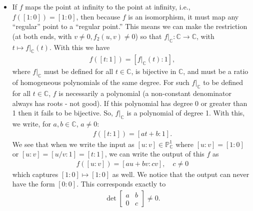 \documentclass[12pt]{article}
\newcommand{\C}{\mathbb{C}}
\begin{document}
\begin{itemize}
\item If $f$ maps the point at infinity to the point at infinity, i.e., $f([1:0]) = [1:0]$, then because $f$ is an isomorphism, it must map any ``regular'' point to a ``regular point.'' This means we can make the restriction (at both ends, with $v\neq 0, f_2(u,v)\neq 0$) so that $f\vert_\C : \C \to \C$, with $t\mapsto f\vert_\C(t)$. With this we have
\begin{align*}
f([t:1]) = [f\vert_\C(t) : 1],
\end{align*}
where $f\vert_\C$ must be defined for all $t\in \C$, is bijective in $\C$, and must be a ratio of homogeneous polynomials of the same degree. For such $f\vert_\C$ to be defined for all $t\in \C$, $f$ is necessarily a polynomial (a non-constant denominator always has roots - not good). If this polynomial has degree 0 or greater than 1 then it fails to be bijective. So, $f\vert_\C$ is a polynomial of degree 1. With this, we write, for $a, b \in \C$, $a \neq 0$:
\begin{align*}
f([t:1]) = [a t + b : 1].
\end{align*}
We see that when we write the input as $[u:v] \in \mathbb{P}^1_\C$ where $[u:v] = [1:0]$ or $[u:v] = [u/v:1] = [t:1]$, we can write the output of this $f$ as
\begin{align*}
f([u:v]) = [au+ bv : cv], \quad c\neq 0
\end{align*}
which captures $[1:0]\mapsto [1:0]$ as well. We notice that the output can never have the form $[0:0]$. This corresponds exactly to 
\begin{align*}
\det\begin{bmatrix}
a & b \\ 0 & c
\end{bmatrix} \neq 0.
\end{align*}





\end{itemize}
\end{document}
